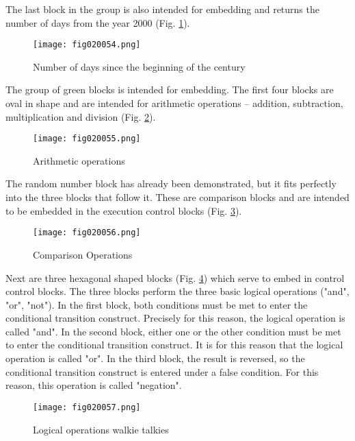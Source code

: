The last block in the group is also intended for embedding and returns the number of days from the year 2000 (Fig. \ref{fig020054}).

\begin{figure}[H]
   \centering
   \texttt{[image: fig020054.png]}
   \caption{Number of days since the beginning of the century}
\label{fig020054}
\end{figure}

The group of green blocks is intended for embedding. The first four blocks are oval in shape and are intended for arithmetic operations – addition, subtraction, multiplication and division (Fig. \ref{fig020055}).

\begin{figure}[H]
   \centering
   \texttt{[image: fig020055.png]}
   \caption{Arithmetic operations}
\label{fig020055}
\end{figure}

The random number block has already been demonstrated, but it fits perfectly into the three blocks that follow it. These are comparison blocks and are intended to be embedded in the execution control blocks (Fig. \ref{fig020056}).

\begin{figure}[H]
   \centering
   \texttt{[image: fig020056.png]}
   \caption{Comparison Operations}
\label{fig020056}
\end{figure}

Next are three hexagonal shaped blocks (Fig. \ref{fig020057}) which serve to embed in control control blocks. The three blocks perform the three basic logical operations ("and", "or", "not"). In the first block, both conditions must be met to enter the conditional transition construct. Precisely for this reason, the logical operation is called "and". In the second block, either one or the other condition must be met to enter the conditional transition construct. It is for this reason that the logical operation is called "or". In the third block, the result is reversed, so the conditional transition construct is entered under a false condition. For this reason, this operation is called "negation".

\begin{figure}[H]
   \centering
   \texttt{[image: fig020057.png]}
   \caption{Logical operations walkie talkies}
\label{fig020057}
\end{figure}

